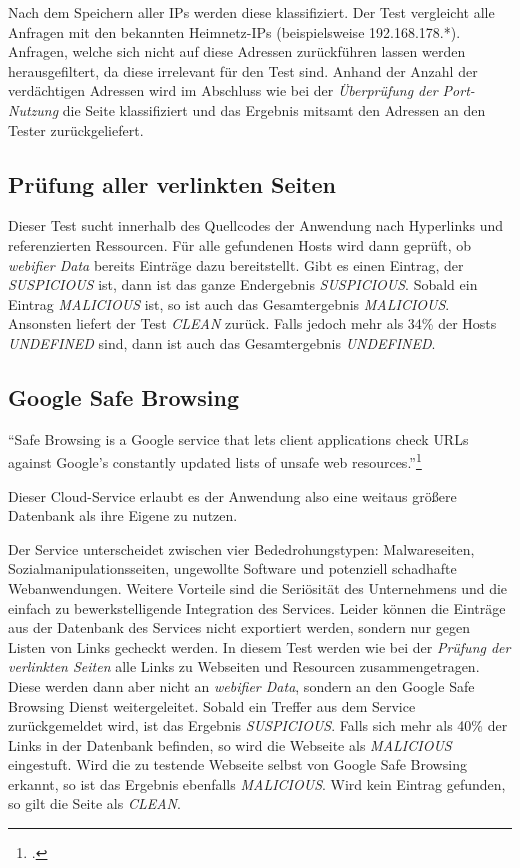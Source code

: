 Nach dem Speichern aller IPs werden diese klassifiziert. Der Test vergleicht alle Anfragen mit den
bekannten Heimnetz-IPs (beispielsweise 192.168.178.*). Anfragen, welche sich nicht auf diese
Adressen zurückführen lassen werden herausgefiltert, da diese irrelevant für den Test sind. Anhand
der Anzahl der verdächtigen Adressen wird im Abschluss wie bei der \textit{Überprüfung der
Port-Nutzung} die Seite klassifiziert und das Ergebnis mitsamt den Adressen an den
Tester zurückgeliefert.

\subsection{Prüfung aller verlinkten Seiten}
\label{sec:konzept-linkchecker}

Dieser Test sucht innerhalb des Quellcodes der Anwendung nach Hyperlinks und referenzierten Ressourcen.
Für alle gefundenen Hosts wird dann geprüft, ob \textit{webifier Data} bereits Einträge dazu
bereitstellt.
Gibt es einen Eintrag, der \textit{SUSPICIOUS} ist, dann ist das ganze Endergebnis \textit{SUSPICIOUS}.
Sobald ein Eintrag \textit{MALICIOUS} ist, so ist auch das Gesamtergebnis \textit{MALICIOUS}.
Ansonsten liefert der Test \textit{CLEAN} zurück. Falls jedoch mehr als 34\% der Hosts
\textit{UNDEFINED} sind, dann ist auch das Gesamtergebnis \textit{UNDEFINED}.

\subsection{Google Safe Browsing}

\begin{center}
	\enquote{Safe Browsing is a Google service that lets client applications check \acsp{URL} against
	Google's constantly updated lists of unsafe web resources.}\footcite[Vgl.][]{googleSafeBrowsing}
\end{center}

Dieser Cloud-Service erlaubt es der Anwendung also eine weitaus größere Datenbank als ihre Eigene zu
nutzen.

Der Service unterscheidet zwischen vier Bededrohungstypen\label{par:konzep-gsb-types}: Malwareseiten, Sozialmanipulationsseiten, ungewollte Software und potenziell schadhafte Webanwendungen.
Weitere Vorteile sind die Seriösität des Unternehmens und die einfach zu bewerkstelligende
Integration des Services.
Leider können die Einträge aus der Datenbank des Services nicht exportiert werden, sondern nur gegen Listen von Links gecheckt werden.
In diesem Test werden wie bei der \textit{Prüfung der verlinkten Seiten} alle Links zu Webseiten und
Resourcen zusammengetragen.
Diese werden dann aber nicht an \textit{webifier Data}, sondern an den Google Safe Browsing Dienst
weitergeleitet.
Sobald ein Treffer aus dem Service zurückgemeldet wird, ist das Ergebnis \textit{SUSPICIOUS}.
Falls sich mehr als 40\% der Links in der Datenbank befinden, so wird die Webseite als
\textit{MALICIOUS} eingestuft.
Wird die zu testende Webseite selbst von Google Safe Browsing erkannt, so ist das Ergebnis ebenfalls
\textit{MALICIOUS}.
Wird kein Eintrag gefunden, so gilt die Seite als \textit{CLEAN}.

